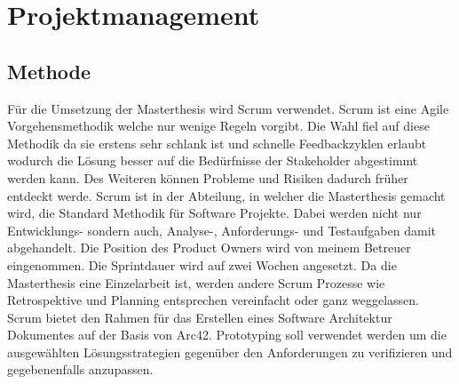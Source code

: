 \chapter{Projektmanagement}

\section{Methode}

Für die Umsetzung der Masterthesis wird Scrum verwendet. Scrum ist eine Agile Vorgehensmethodik welche nur wenige Regeln vorgibt. Die Wahl fiel auf diese Methodik da sie erstens sehr schlank ist und schnelle Feedbackzyklen erlaubt wodurch die Lösung besser auf die Bedürfnisse der Stakeholder abgestimmt werden kann. Des Weiteren können Probleme und Risiken dadurch früher entdeckt werde. Scrum ist in der Abteilung, in welcher die Masterthesis gemacht wird, die Standard Methodik für Software Projekte. Dabei werden nicht nur Entwicklungs- sondern auch, Analyse-, Anforderungs- und Testaufgaben damit abgehandelt. Die Position des Product Owners wird von meinem Betreuer eingenommen. Die Sprintdauer wird auf zwei Wochen angesetzt. Da die Masterthesis eine Einzelarbeit ist, werden andere Scrum Prozesse wie Retrospektive und Planning entsprechen vereinfacht oder ganz weggelassen. Scrum bietet den Rahmen für das Erstellen eines Software Architektur Dokumentes auf der Basis von Arc42.
Prototyping soll verwendet werden um die ausgewählten Lösungsstrategien gegenüber den Anforderungen zu verifizieren und gegebenenfalls anzupassen.  

